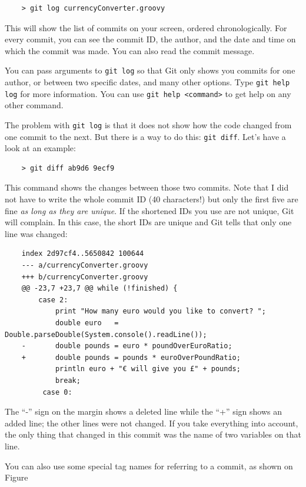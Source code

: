\begin{verbatim}
    > git log currencyConverter.groovy
\end{verbatim}

This will show the list of commits on your screen, ordered
chronologically. For every commit, you can see the commit ID, the
author, and the date and time on which the commit was made. You can
also read the commit message. 

You can pass arguments to \verb+git log+ so that Git only shows you
commits for one author, or between two specific dates, and many
other options. Type \verb+git help log+ for more information. You can
use \verb+git help <command>+ to get help on any other command. 

The problem with \verb+git log+ is that it does not show how the code
changed from one commit to the next. But there is a way to do this:
\verb+git diff+. Let's have a look at an example: 

\begin{verbatim}
    > git diff ab9d6 9ecf9
\end{verbatim}

This command shows the changes between those two commits. Note that I
did not have to write the whole commit ID (40 characters!) but only
the first five are fine \emph{as long as they are unique}. If the
shortened IDs you use are not unique, Git will complain. In this case,
the short IDs are unique and Git tells that only one line was changed: 

\begin{verbatim}
    index 2d97cf4..5650842 100644
    --- a/currencyConverter.groovy
    +++ b/currencyConverter.groovy
    @@ -23,7 +23,7 @@ while (!finished) {
        case 2: 
            print "How many euro would you like to convert? ";
            double euro   = Double.parseDouble(System.console().readLine());
    -       double pounds = euro * poundOverEuroRatio;
    +       double pounds = pounds * euroOverPoundRatio;
            println euro + "€ will give you £" + pounds;
            break;
         case 0:  
\end{verbatim}

The ``-'' sign on the margin shows a deleted line while the ``+'' sign
shows an added line; the other lines were not changed. 
If you take everything into account, the only thing that changed
in this commit was the name of two variables on that line. 

You can also use some special tag names for referring to a commit, as
shown on Figure

